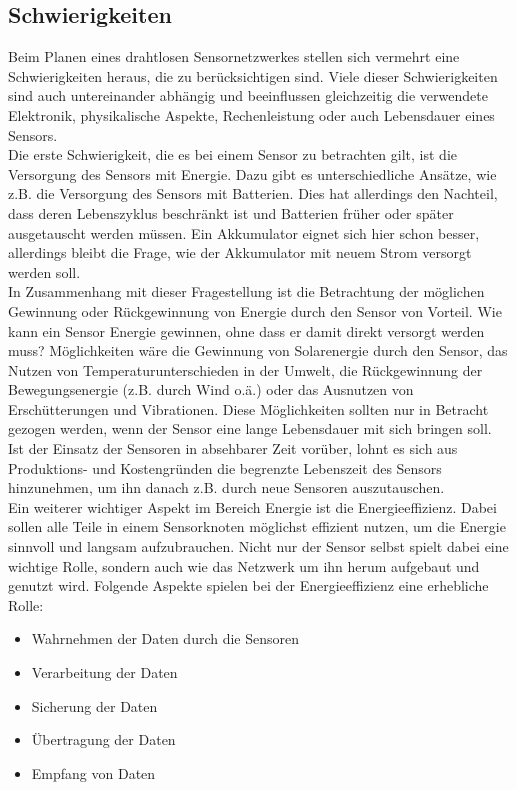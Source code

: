 \subsection{Schwierigkeiten}\label{ss:Schwierigkeiten}

Beim Planen eines drahtlosen Sensornetzwerkes stellen sich vermehrt eine Schwierigkeiten heraus, die zu berücksichtigen sind. Viele dieser Schwierigkeiten sind auch untereinander abhängig und beeinflussen gleichzeitig die verwendete Elektronik, physikalische Aspekte, Rechenleistung oder auch Lebensdauer eines Sensors.\\

Die erste Schwierigkeit, die es bei einem Sensor zu betrachten gilt, ist die Versorgung des Sensors mit Energie. Dazu gibt es unterschiedliche Ansätze, wie z.B. die Versorgung des Sensors mit Batterien. Dies hat allerdings den Nachteil, dass deren Lebenszyklus beschränkt ist und Batterien früher oder später ausgetauscht werden müssen. Ein Akkumulator eignet sich hier schon besser, allerdings bleibt die Frage, wie der Akkumulator mit neuem Strom versorgt werden soll.\\

In Zusammenhang mit dieser Fragestellung ist die Betrachtung der möglichen Gewinnung oder Rückgewinnung von Energie durch den Sensor von Vorteil. Wie kann ein Sensor Energie gewinnen, ohne dass er damit direkt versorgt werden muss? Möglichkeiten wäre die Gewinnung von Solarenergie durch den Sensor, das Nutzen von Temperaturunterschieden in der Umwelt, die Rückgewinnung der Bewegungsenergie (z.B. durch Wind o.ä.) oder das Ausnutzen von Erschütterungen und Vibrationen. Diese Möglichkeiten sollten nur in Betracht gezogen werden, wenn der Sensor eine lange Lebensdauer mit sich bringen soll. Ist der Einsatz der Sensoren in absehbarer Zeit vorüber, lohnt es sich aus Produktions- und Kostengründen die begrenzte Lebenszeit des Sensors hinzunehmen, um ihn danach z.B. durch neue Sensoren auszutauschen.\\

Ein weiterer wichtiger Aspekt im Bereich Energie ist die Energieeffizienz. Dabei sollen alle Teile in einem Sensorknoten möglichst effizient nutzen, um die Energie sinnvoll und langsam aufzubrauchen. Nicht nur der Sensor selbst spielt dabei eine wichtige Rolle, sondern auch wie das Netzwerk um ihn herum aufgebaut und genutzt wird. Folgende Aspekte spielen bei der Energieeffizienz eine erhebliche Rolle:

\begin{itemize}
	\item Wahrnehmen der Daten durch die Sensoren
	\item Verarbeitung der Daten
	\item Sicherung der Daten
	\item Übertragung der Daten
	\item Empfang von Daten
\end{itemize} 

